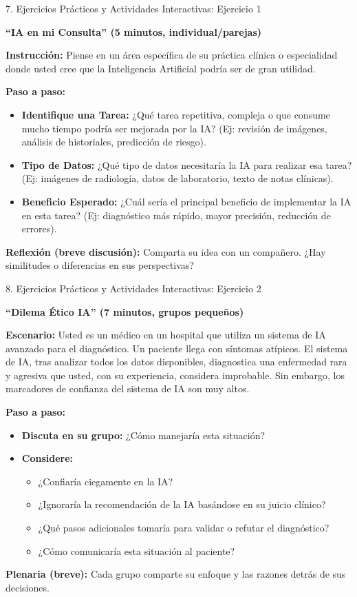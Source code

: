 \documentclass[aspectratio=169]{beamer}
\begin{document}
\begin{frame}[fragile]{7. Ejercicios Prácticos y Actividades Interactivas: Ejercicio 1}


\textbf{``IA en mi Consulta'' (5 minutos, individual/parejas)}

\textbf{Instrucción:} Piense en un área específica de su práctica clínica o especialidad donde usted cree que la Inteligencia Artificial podría ser de gran utilidad.

\textbf{Paso a paso:}
\begin{itemize}
  \item \textbf{Identifique una Tarea:} ¿Qué tarea repetitiva, compleja o que consume mucho tiempo podría ser mejorada por la IA? (Ej: revisión de imágenes, análisis de historiales, predicción de riesgo).
  \item \textbf{Tipo de Datos:} ¿Qué tipo de datos necesitaría la IA para realizar esa tarea? (Ej: imágenes de radiología, datos de laboratorio, texto de notas clínicas).
  \item \textbf{Beneficio Esperado:} ¿Cuál sería el principal beneficio de implementar la IA en esta tarea? (Ej: diagnóstico más rápido, mayor precisión, reducción de errores).
\end{itemize}
\textbf{Reflexión (breve discusión):} Comparta su idea con un compañero. ¿Hay similitudes o diferencias en sus perspectivas?

\end{frame}



\begin{frame}[fragile]{8. Ejercicios Prácticos y Actividades Interactivas: Ejercicio 2}


\textbf{``Dilema Ético IA'' (7 minutos, grupos pequeños)}

\textbf{Escenario:} Usted es un médico en un hospital que utiliza un sistema de IA avanzado para el diagnóstico. Un paciente llega con síntomas atípicos. El sistema de IA, tras analizar todos los datos disponibles, diagnostica una enfermedad rara y agresiva que usted, con su experiencia, considera improbable. Sin embargo, los marcadores de confianza del sistema de IA son muy altos.

\textbf{Paso a paso:}
\begin{itemize}
  \item \textbf{Discuta en su grupo:} ¿Cómo manejaría esta situación?
  \item \textbf{Considere:}
  \begin{itemize}
    \item ¿Confiaría ciegamente en la IA?
    \item ¿Ignoraría la recomendación de la IA basándose en su juicio clínico?
    \item ¿Qué pasos adicionales tomaría para validar o refutar el diagnóstico?
    \item ¿Cómo comunicaría esta situación al paciente?
  \end{itemize}
\end{itemize}
\textbf{Plenaria (breve):} Cada grupo comparte su enfoque y las razones detrás de sus decisiones.

\end{frame}
\end{document}

